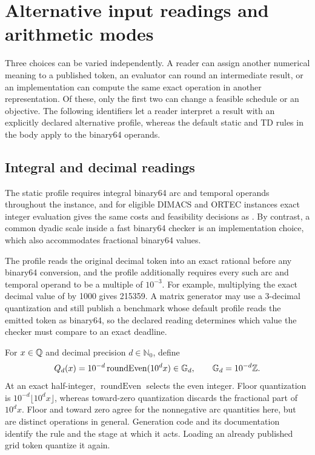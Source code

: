 \section{Alternative input readings and arithmetic modes}\label{app:alternatives}
Three choices can be varied independently. A reader can assign another numerical meaning to a published token, an evaluator can round an intermediate result, or an implementation can compute the same exact operation in another representation. Of these, only the first two can change a feasible schedule or an objective. The following identifiers let a reader interpret a result with an explicitly declared alternative profile, whereas the default static and TD rules in the body apply to the binary64 operands.

\subsection{Integral and decimal readings}
The static profile  requires integral binary64 arc and temporal operands throughout the instance, and for eligible DIMACS and ORTEC instances exact integer evaluation gives the same costs and feasibility decisions as . By contrast, a common dyadic scale inside a fast binary64 checker is an implementation choice, which also accommodates fractional binary64 values.

The  profile reads the original decimal token into an exact rational before any binary64 conversion, and the  profile additionally requires every such arc and temporal operand to be a multiple of $10^{-3}$. For example, multiplying the exact decimal value of  by 1000 gives 215359. A matrix generator may use a 3-decimal quantization and still publish a benchmark whose default profile reads the emitted token as binary64, so the declared reading determines which value the checker must compare to an exact deadline.

For $x\in\mathbb{Q}$ and decimal precision $d\in\mathbb{N}_0$, define
\begin{equation}\label{eq:decimal-quantization}
Q_d(x)=10^{-d}\operatorname{roundEven}(10^d x)\in\mathbb{G}_{d},\qquad \mathbb{G}_{d}=10^{-d}\mathbb{Z}.
\end{equation}
At an exact half-integer, $\operatorname{roundEven}$ selects the even integer. Floor quantization is $10^{-d}\lfloor10^d x\rfloor$, whereas toward-zero quantization discards the fractional part of $10^d x$. Floor and toward zero agree for the nonnegative arc quantities here, but are distinct operations in general. Generation code and its documentation \must{} identify the rule and the stage at which it acts. Loading an already published grid token \mustnot{} quantize it again.

